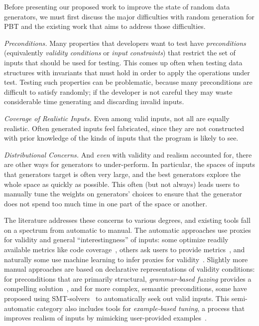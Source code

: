 %
Before presenting our proposed work to improve the state of random data
generators, we must first discuss the major difficulties with random generation
for PBT and the existing work that aims to address those difficulties.


{\em Preconditions.}
Many properties that developers want to test have {\em preconditions}
(equivalently {\em validity conditions} or {\em input constraints}) that
restrict the set of inputs that should be used for testing. This comes up often
when testing data structures with invariants that must hold in order to apply
the operations under test. Testing such properties can be problematic, because
many preconditions are difficult to satisfy randomly; if the developer is not
careful they may waste considerable time generating and discarding invalid inputs.

{\em Coverage of Realistic Inputs.}
Even among valid inputs, not all are equally realistic. Often generated inputs
feel fabricated, since they are not constructed with prior knowledge of the
kinds of inputs that the program is likely to see.

{\em Distributional Concerns.}
And {\em even} with validity and realism accounted for, there are other ways for
generators to under-perform. In particular, the spaces of inputs that generators
target is often very large, and the best generators explore the whole
space as
quickly as possible. This often (but not always) leads users to manually tune
the weights on generators' choices to ensure that the generator does not spend
too much time in one part of the space or another.


The literature addresses these concerns to various degrees, and existing tools
fall on a spectrum from automatic to manual. The automatic approaches use
proxies for validity and general ``interestingness'' of inputs: some optimize
readily available metrics like code coverage~\cite{afl-readme}, others ask users
to provide metrics~\cite{loscher2017targetedpbt}, and naturally some use
machine learning to infer proxies for validity~\cite{godefroid2017learn,
DBLP:conf/icse/ReddyLPS20}. Slightly more manual approaches are based on
declarative representations of validity conditions: for preconditions that are
primarily structural, {\em grammar-based fuzzing} provides a compelling
solution~\cite{godefroid2008grammar, holler2012fuzzing, veggalam2016ifuzzer,
wang2019superion, srivastava2021gramatron}, and for more complex, semantic
preconditions, some have proposed using SMT-solvers~\cite{dewey2017automated, LuckPOPL, steinhofel2022input} to
automatically seek out valid inputs. This semi-automatic category also includes
tools for {\em example-based tuning}, a process that improves realism of inputs
by mimicking user-provided examples~\cite{soremekun2020inputs}.

